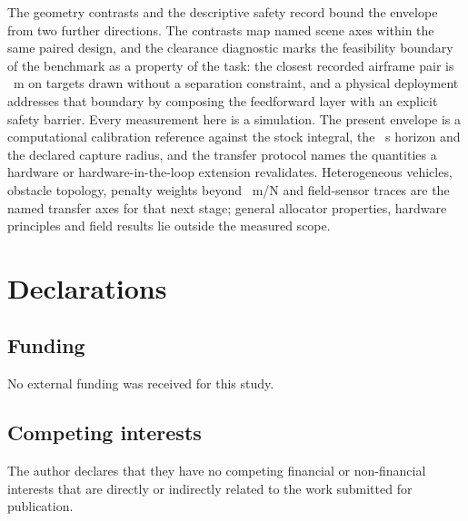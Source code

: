 The geometry contrasts and the descriptive safety record bound the envelope
from two further directions. The contrasts map named scene axes within the
same paired design, and the clearance diagnostic marks the feasibility
boundary of the benchmark as a property of the task: the closest recorded
airframe pair is \SafetyWorstSeparation{}~m on targets drawn without a
separation constraint, and a physical deployment addresses that boundary by
composing the feedforward layer with an explicit safety barrier. Every
measurement here is a simulation. The present envelope is a computational
calibration reference against the stock integral, the \EpisodeHorizonS{}~s
horizon and the declared capture radius, and the transfer protocol names the
quantities a hardware or hardware-in-the-loop extension revalidates.
Heterogeneous vehicles, obstacle topology, penalty weights beyond
\LambdaGridMax{}~m/N and field-sensor traces are the named transfer axes for
that next stage; general allocator properties, hardware principles and field
results lie outside the measured scope.

\section*{Declarations}

\subsection*{Funding}

No external funding was received for this study.

\subsection*{Competing interests}

The author declares that they have no competing financial or non-financial
interests that are directly or indirectly related to the work submitted for
publication.

